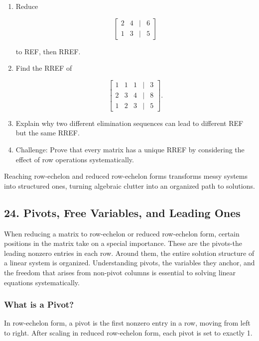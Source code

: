 \documentclass[
  letterpaper,
  DIV=11,
  numbers=noendperiod]{scrreprt}
\begin{document}
\begin{enumerate}
\def\labelenumi{\arabic{enumi}.}
\item
  Reduce

  \[
  \begin{bmatrix}  
  2 & 4 & | & 6 \\  
  1 & 3 & | & 5  
  \end{bmatrix}
  \]

  to REF, then RREF.
\item
  Find the RREF of

  \[
  \begin{bmatrix}  
  1 & 1 & 1 & | & 3 \\  
  2 & 3 & 4 & | & 8 \\  
  1 & 2 & 3 & | & 5  
  \end{bmatrix}.
  \]
\item
  Explain why two different elimination sequences can lead to different
  REF but the same RREF.
\item
  Challenge: Prove that every matrix has a unique RREF by considering
  the effect of row operations systematically.
\end{enumerate}

Reaching row-echelon and reduced row-echelon forms transforms messy
systems into structured ones, turning algebraic clutter into an
organized path to solutions.

\subsection{24. Pivots, Free Variables, and Leading
Ones}\label{pivots-free-variables-and-leading-ones}

When reducing a matrix to row-echelon or reduced row-echelon form,
certain positions in the matrix take on a special importance. These are
the pivots-the leading nonzero entries in each row. Around them, the
entire solution structure of a linear system is organized. Understanding
pivots, the variables they anchor, and the freedom that arises from
non-pivot columns is essential to solving linear equations
systematically.

\subsubsection{What is a Pivot?}\label{what-is-a-pivot}

In row-echelon form, a pivot is the first nonzero entry in a row, moving
from left to right. After scaling in reduced row-echelon form, each
pivot is set to exactly 1.
\end{document}
